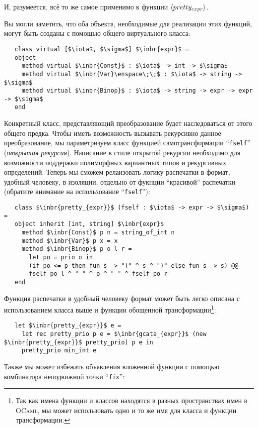 И, разумеется, всё то же  самое применимо к функции $\left<pretty_{expr}\right>$.

Вы могли заметить, что оба объекта, необходимые для реализации этих функций, могут быть созданы с помощью общего виртуального класса:

\begin{lstlisting}
   class virtual [$\iota$, $\sigma$] $\inbr{expr}$ =
   object
     method virtual $\inbr{Const}$ : $\iota$ -> int -> $\sigma$
     method virtual $\inbr{Var}\enspace\;\;$ : $\iota$ -> string -> $\sigma$
     method virtual $\inbr{Binop}$ : $\iota$ -> string -> expr -> expr -> $\sigma$  
   end
\end{lstlisting}

Конкретный класс, представляющий преобразование будет наследоваться от этого общего предка. Чтобы иметь возможность 
вызывать рекурсивно данное преобразование, мы параметризуем класс функцией самотрансформации ``\lstinline{fself}'' 
(\emph{открытая рекурсия}). 
Написание в стиле открытой рекурсии необходимо для возможности поддержки полиморфных вариантных типов и рекурсивных определений.
Теперь мы сможем релаизовать логику распечатки в формат, удобный человеку, в изоляции, отдельно от фукнции ``красивой'' распечатки
 (обратите внимание на использование ``\lstinline{fself}''):

\begin{lstlisting}
   class $\inbr{pretty_{expr}}$ (fself : $\iota$ -> expr -> $\sigma$) =
   object inherit [int, string] $\inbr{expr}$ 
     method $\inbr{Const}$ p n = string_of_int n
     method $\inbr{Var}$ p x = x
     method $\inbr{Binop}$ p o l r =
       let po = prio o in
       (if po <= p then fun s -> "(" ^ s ^ ")" else fun s -> s) @@
       fself po l ^ " " ^ o ^ " " ^ fself po r
   end
\end{lstlisting}

Функция распечатки в удобный человеку формат может быть легко описана с использованием класса выше и функции обощенной 
трансформации\footnote{Так как имена функции и классов находятся в разных пространствах имен в \textsc{OCaml}, мы может 
использовать одно и то же имя для класса и функции трансформации.}:

\begin{lstlisting}
   let $\inbr{pretty_{expr}}$ e =
     let rec pretty_prio p e = $\inbr{gcata_{expr}}$ (new $\inbr{pretty_{expr}}$ pretty_prio) p e in
     pretty_prio min_int e
\end{lstlisting}

Также мы может избежать объявления вложенной функции с помощью комбинатора неподвижной точки ``\lstinline{fix}'':

